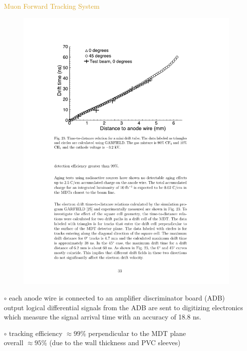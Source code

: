 \begin{frame}{\textcolor{Goldenrod}{Muon Forward Tracking System}}
  \begin{overlayarea}{\textwidth}{\textheight}
    \begin{figure}[h]
      \centering
      \includegraphics[height=0.35\textheight]{./Images/45_MD_miniPDT_03.pdf}
    \end{figure}
    \itt
  \item[$\circ$]
    each anode wire is
    connected to an amplifier discriminator board (ADB)\\
    
    output logical differential signals from the ADB are sent to
    digitizing electronics which measure the signal arrival time with
    an accuracy of 18.8 ns.
    
  \item[$\circ$]
    tracking efficiency $\approx 99$\% perpendicular to the MDT plane\\
    overall $\approx 95$\% (due to the wall thickness and PVC sleeves) 
    \tti
  \end{overlayarea}
\end{frame}


